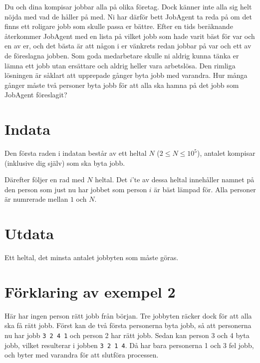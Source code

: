 Du och dina kompisar jobbar alla på olika företag. 
Dock känner inte alla sig helt nöjda med vad de håller på med. 
Ni har därför bett JobAgent ta reda på om det finns ett roligare jobb som skulle passa er bättre.
Efter en tids beräknande återkommer JobAgent med en lista på vilket jobb som hade varit bäst för var och en av er, och det bästa är att någon i er vänkrets redan jobbar på var och ett av de föreslagna jobben. 
Som goda medarbetare skulle ni aldrig kunna tänka er lämna ett jobb utan ersättare och aldrig heller vara arbetslösa.
Den rimliga lösningen är såklart att upprepade gånger byta jobb med varandra.
Hur många gånger måste två personer byta jobb för att alla ska hamna på det jobb som JobAgent föreslagit?

\section*{Indata}
Den första raden i indatan består av ett heltal $N$ ($2 \le N \le 10^5$), antalet kompisar (inklusive dig själv) som ska byta jobb.

Därefter följer en rad med $N$ heltal.
Det $i$'te av dessa heltal innehåller namnet på den person som just nu har jobbet som person $i$ är bäst lämpad för.
Alla personer är numrerade mellan $1$ och $N$.

\section*{Utdata}
Ett heltal, det minsta antalet jobbyten som måste göras. 

\section*{Förklaring av exempel 2}
Här har ingen person rätt jobb från början.
Tre jobbyten räcker dock för att alla ska få rätt jobb.
Först kan de två första personerna byta jobb, så att personerna nu har jobb \texttt{3 2 4 1} och person 2 har rätt jobb.
Sedan kan person 3 och 4 byta jobb, vilket resulterar i jobben \texttt{3 2 1 4}.
Då har bara personerna 1 och 3 fel jobb, och byter med varandra för att slutföra processen.
